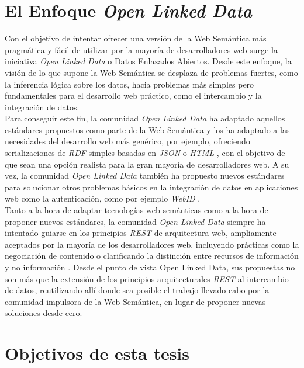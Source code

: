 \section{El Enfoque \textit{Open Linked Data}}
Con el objetivo de intentar ofrecer una versi\'on de la Web Sem\'antica m\'as pragm\'atica y f\'acil de utilizar por la mayor\'ia de desarrolladores web surge la iniciativa {\it Open Linked Data} o Datos Enlazados Abiertos. 
Desde este enfoque, la visi\'on de lo que supone la Web Sem\'antica se desplaza de problemas fuertes, como la inferencia l\'ogica sobre los datos, hacia problemas m\'as simples pero fundamentales para el desarrollo web pr\'actico, como el intercambio y la integraci\'on de datos.\\
Para conseguir este fin, la comunidad {\it Open Linked Data} ha adaptado aquellos est\'andares propuestos como parte de la Web Sem\'antica y los ha adaptado a las necesidades del desarrollo web m\'as gen\'erico, por ejemplo, ofreciendo serializaciones de {\it RDF} simples basadas en {\it JSON} \cite{jsonld} o {\it HTML} \cite{rdfa}, con el objetivo de que sean una opci\'on realista para la gran mayor\'ia de desarrolladores web. A su vez, la comunidad {\it Open Linked Data} tambi\'en ha propuesto nuevos est\'andares para solucionar otros problemas b\'asicos en la integraci\'on de datos en aplicaciones web como la autenticaci\'on, como por ejemplo {\it WebID} \cite{webid}.\\
Tanto a la hora de adaptar tecnolog\'ias web sem\'anticas como a la hora de proponer nuevos est\'andares, la comunidad {\it Open Linked Data} siempre ha intentado guiarse en los principios {\it REST} de arquitectura web, ampliamente aceptados por la mayor\'ia de los desarrolladores web, incluyendo pr\'acticas como la negociaci\'on de contenido \cite{holtman1998transparent} o clarificando la distinci\'on entre recursos de informaci\'on y no informaci\'on \cite{fielding2005httprange}. 
Desde el punto de vista Open Linked Data, sus propuestas no son m\'as que la extensi\'on de los principios arquitecturales {\it REST} al intercambio de datos, reutilizando all\'i donde sea posible el trabajo llevado cabo por la comunidad impulsora de la Web Sem\'antica, en lugar de proponer nuevas soluciones desde cero.

\section{Objetivos de esta tesis}

